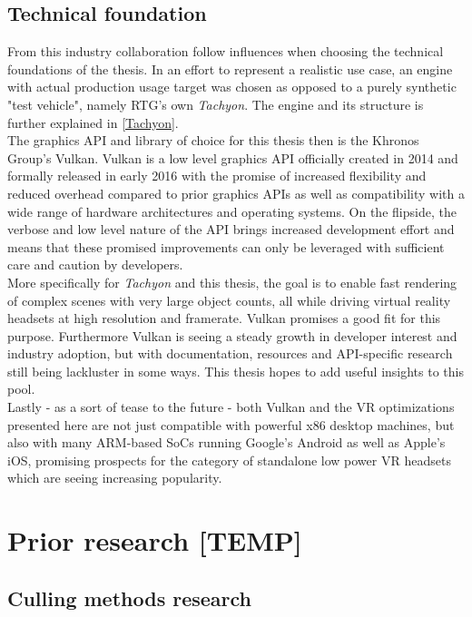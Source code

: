 \section{Technical foundation}
From this industry collaboration follow influences when choosing the technical foundations of the thesis. In an effort to represent a realistic use case, an engine with actual production usage target was chosen as opposed to a purely synthetic "test vehicle", namely RTG's own \textit{Tachyon}. The engine and its structure is further explained in \autoref{Tachyon}. \\
The graphics API and library of choice for this thesis then is the Khronos Group's Vulkan. Vulkan is a low level graphics API officially created in 2014 and formally released in early 2016 with the promise of increased flexibility and reduced overhead compared to prior graphics APIs as well as compatibility with a wide range of hardware architectures and operating systems\cite{TheKhronosGroupInc..2016}. On the flipside, the verbose and low level nature of the API brings increased development effort and means that these promised improvements can only be leveraged with sufficient care and caution by developers. \\
More specifically for \textit{Tachyon} and this thesis, the goal is to enable fast rendering of complex scenes with very large object counts, all while driving virtual reality headsets at high resolution and framerate. Vulkan promises a good fit for this purpose. Furthermore Vulkan is seeing a steady growth in developer interest and industry adoption, but with documentation, resources and API-specific research still being lackluster in some ways. This thesis hopes to add useful insights to this pool. \\
Lastly - as a sort of tease to the future - both Vulkan and the VR optimizations presented here are not just compatible with powerful x86 desktop machines, but also with many ARM-based SoCs running Google's Android as well as Apple's iOS, promising prospects for the category of standalone low power VR headsets which are seeing increasing popularity\cite{AntonyVitillo.2018}\cite{IDCCorporateUSA.2020}. 



\iffalse
\chapter{Prior research [TEMP]}\label{chapter:introduction}

\section{Culling methods research}
